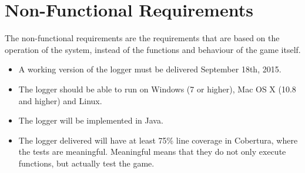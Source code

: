 \chapter{Non-Functional Requirements}

The non-functional requirements are the requirements that are based on the operation of the system, instead of the functions and behaviour of the game itself.

\begin{itemize}
\itemsep0em
	\item A working version of the logger must be delivered September 18th, 2015.
	\item The logger should be able to run on Windows (7 or higher), Mac OS X (10.8 and higher) and Linux.
	\item The logger will be implemented in Java. 
	\item The logger delivered will have at least 75\% line coverage in Cobertura, where the tests are meaningful. Meaningful means that they do not only execute functions, but actually test the game. 
\end{itemize}